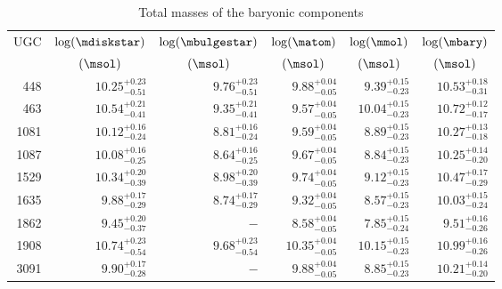 %
\begin{table}
\caption{\label{tab:Masses}
Total masses of the baryonic components}
\centering
%
\renewcommand{\tabcolsep}{1.4mm}
\renewcommand{\arraystretch}{1.5}
%
\begin{tabular}{|r r r r r r|}
\hline
%
\multicolumn{1}{|c}{UGC}                  &    
\multicolumn{1}{c}{$\log(\mdiskstar)$}    &   
\multicolumn{1}{c}{$\log(\mbulgestar)$}   &    
\multicolumn{1}{c}{$\log(\matom)$}        &   
\multicolumn{1}{c}{$\log(\mmol)$}         &   
\multicolumn{1}{c|}{$\log(\mbary)$}        \\
%
\multicolumn{1}{|c}{}              &    
\multicolumn{1}{c}{$(\msol)$}      &   
\multicolumn{1}{c}{$(\msol)$}      &    
\multicolumn{1}{c}{$(\msol)$}      &  
\multicolumn{1}{c}{$(\msol)$}      &    
\multicolumn{1}{c|}{$(\msol)$}     \\
\hline
  448 & $10.25_{-0.51}^{+0.23}$ & $ 9.76_{-0.51}^{+0.23}$ & $ 9.88_{-0.05}^{+0.04}$ & $ 9.39_{-0.23}^{+0.15}$ & $10.53_{-0.31}^{+0.18}$ \\
  463 & $10.54_{-0.41}^{+0.21}$ & $ 9.35_{-0.41}^{+0.21}$ & $ 9.57_{-0.05}^{+0.04}$ & $10.04_{-0.23}^{+0.15}$ & $10.72_{-0.17}^{+0.12}$ \\
 1081 & $10.12_{-0.24}^{+0.16}$ & $ 8.81_{-0.24}^{+0.16}$ & $ 9.59_{-0.05}^{+0.04}$ & $ 8.89_{-0.23}^{+0.15}$ & $10.27_{-0.18}^{+0.13}$ \\
 1087 & $10.08_{-0.25}^{+0.16}$ & $ 8.64_{-0.25}^{+0.16}$ & $ 9.67_{-0.05}^{+0.04}$ & $ 8.84_{-0.23}^{+0.15}$ & $10.25_{-0.20}^{+0.14}$ \\
 1529 & $10.34_{-0.39}^{+0.20}$ & $ 8.98_{-0.39}^{+0.20}$ & $ 9.74_{-0.05}^{+0.04}$ & $ 9.12_{-0.23}^{+0.15}$ & $10.47_{-0.29}^{+0.17}$ \\
 1635 & $ 9.88_{-0.29}^{+0.17}$ & $ 8.74_{-0.29}^{+0.17}$ & $ 9.32_{-0.05}^{+0.04}$ & $ 8.57_{-0.23}^{+0.15}$ & $10.03_{-0.24}^{+0.15}$ \\
 1862 & $ 9.45_{-0.37}^{+0.20}$ & $    -                $ & $ 8.58_{-0.05}^{+0.04}$ & $ 7.85_{-0.24}^{+0.15}$ & $ 9.51_{-0.26}^{+0.16}$ \\
 1908 & $10.74_{-0.54}^{+0.23}$ & $ 9.68_{-0.54}^{+0.23}$ & $10.35_{-0.05}^{+0.04}$ & $10.15_{-0.23}^{+0.15}$ & $10.99_{-0.26}^{+0.16}$ \\
 3091 & $ 9.90_{-0.28}^{+0.17}$ & $    -                $ & $ 9.88_{-0.05}^{+0.04}$ & $ 8.85_{-0.23}^{+0.15}$ & $10.21_{-0.20}^{+0.14}$ \\

\end{tabular}
\end{table}
